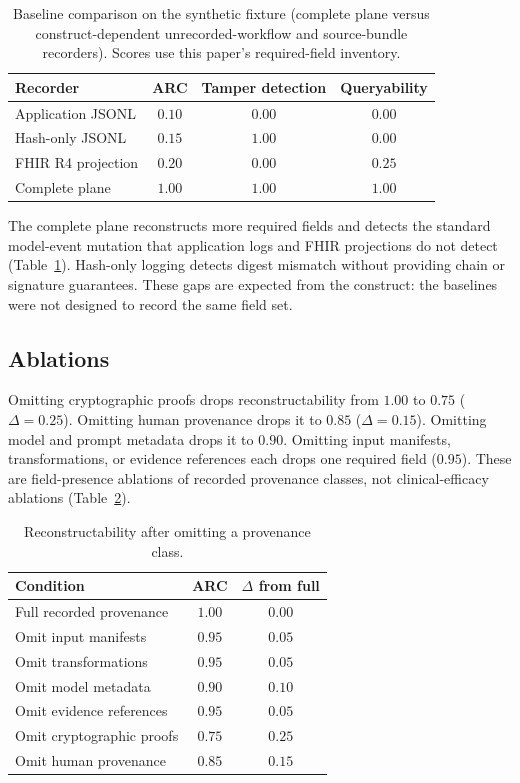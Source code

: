 \documentclass[journal]{IEEEtran}
\begin{document}
\begin{table}[!t]
\centering
\caption{Baseline comparison on the synthetic fixture (complete plane versus
construct-dependent unrecorded-workflow and source-bundle recorders). Scores
use this paper's required-field inventory.}
\label{tab:baselines}
\begin{tabular}{lccc}
\toprule
Recorder & ARC & Tamper detection & Queryability \\
\midrule
Application JSONL & $0.10$ & $0.00$ & $0.00$ \\
Hash-only JSONL & $0.15$ & $1.00$ & $0.00$ \\
FHIR R4 projection & $0.20$ & $0.00$ & $0.25$ \\
Complete plane & $1.00$ & $1.00$ & $1.00$ \\
\bottomrule
\end{tabular}
\end{table}

The complete plane reconstructs more required fields and detects the standard
model-event mutation that application logs and FHIR projections do not detect
(Table~\ref{tab:baselines}). Hash-only logging detects digest mismatch without
providing chain or signature guarantees. These gaps are expected from the
construct: the baselines were not designed to record the same field set.

\subsection{Ablations}
Omitting cryptographic proofs drops reconstructability from $1.00$ to $0.75$
($\Delta=0.25$). Omitting human provenance drops it to $0.85$
($\Delta=0.15$). Omitting model and prompt metadata drops it to $0.90$.
Omitting input manifests, transformations, or evidence references each drops
one required field ($0.95$). These are field-presence ablations of recorded
provenance classes, not clinical-efficacy ablations
(Table~\ref{tab:ablation}).

\begin{table}[!t]
\centering
\caption{Reconstructability after omitting a provenance class.}
\label{tab:ablation}
\begin{tabular}{lcc}
\toprule
Condition & ARC & $\Delta$ from full \\
\midrule
Full recorded provenance & $1.00$ & $0.00$ \\
Omit input manifests & $0.95$ & $0.05$ \\
Omit transformations & $0.95$ & $0.05$ \\
Omit model metadata & $0.90$ & $0.10$ \\
Omit evidence references & $0.95$ & $0.05$ \\
Omit cryptographic proofs & $0.75$ & $0.25$ \\
Omit human provenance & $0.85$ & $0.15$ \\
\bottomrule
\end{tabular}
\end{table}
\end{document}
